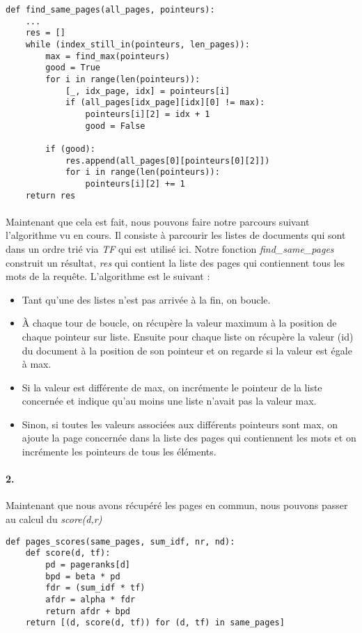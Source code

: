 \documentclass[10pt,a4paper]{article}
\begin{document}
\begin{verbatim}
def find_same_pages(all_pages, pointeurs):
    ...
    res = []
    while (index_still_in(pointeurs, len_pages)):
        max = find_max(pointeurs)
        good = True
        for i in range(len(pointeurs)):
            [_, idx_page, idx] = pointeurs[i]
            if (all_pages[idx_page][idx][0] != max):
                pointeurs[i][2] = idx + 1
                good = False

        if (good):
            res.append(all_pages[0][pointeurs[0][2]])
            for i in range(len(pointeurs)):
                pointeurs[i][2] += 1
    return res
\end{verbatim}

\paragraph{}Maintenant que cela est fait, nous pouvons faire notre parcours suivant l'algorithme vu en cours. Il consiste à parcourir les listes de documents qui sont dans un ordre trié via \textit{TF} qui est utilisé ici. Notre fonction \textit{find\_same\_pages} construit un résultat, \textit{res} qui contient la liste des pages qui contiennent tous les mots de la requête. L'algorithme est le suivant :
 \begin{itemize}
 	\item Tant qu'une des listes n'est pas arrivée à la fin, on boucle.
 	\item À chaque tour de boucle, on récupère la valeur maximum à la position de chaque pointeur sur liste. Ensuite pour chaque liste on récupère la valeur (id) du document à la position de son pointeur et on regarde si la valeur est égale à max.
 	\item Si la valeur est différente de max, on incrémente le pointeur de la liste concernée et indique qu'au moins une liste n'avait pas la valeur max.
 	\item Sinon, si toutes les valeurs associées aux différents pointeurs sont max, on ajoute la page concernée dans la liste des pages qui contiennent les mots et on incrémente les pointeurs de tous les éléments. 
 \end{itemize}

\paragraph{2.} Maintenant que nous avons récupéré les pages en commun, nous pouvons passer au calcul du \textit{score(d,r)}
\begin{verbatim}
def pages_scores(same_pages, sum_idf, nr, nd):
    def score(d, tf):
        pd = pageranks[d]
        bpd = beta * pd
        fdr = (sum_idf * tf)
        afdr = alpha * fdr
        return afdr + bpd
    return [(d, score(d, tf)) for (d, tf) in same_pages]
\end{verbatim}
\end{document}
